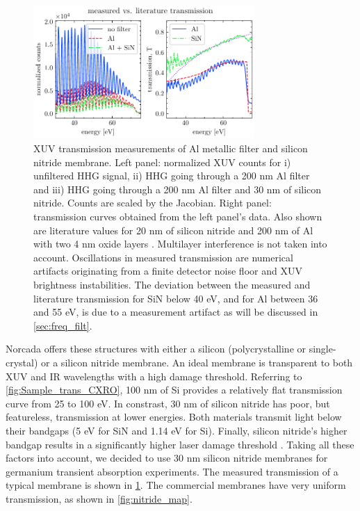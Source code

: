 \begin{figure}
	\centering
	\includegraphics[width=0.75\textwidth]{figures/chap4/SiN_Al_transmission.pdf}
	\caption{XUV transmission measurements of Al metallic filter and silicon nitride membrane. Left panel: normalized XUV counts for i) unfiltered HHG signal, ii) HHG going through a 200 nm Al filter and iii) HHG going through a 200 nm Al filter and 30 nm of silicon nitride. Counts are scaled by the Jacobian. Right panel: transmission curves obtained from the left panel's data. Also shown are literature values for 20 nm of silicon nitride and 200 nm of Al with two 4 nm oxide layers \cite{gulliksonCXROXRayInteractions}. Multilayer interference is not taken into account. Oscillations in measured transmission are numerical artifacts originating from a finite detector noise floor and XUV brightness instabilities. The deviation between the measured and literature transmission for SiN below 40 eV, and for Al between 36 and 55 eV, is due to a measurement artifact as will be discussed in \cref{sec:freq_filt}.}
	\label{fig:SiN_Al_transmission}
\end{figure}

Norcada offers these structures with either a silicon (polycrystalline or single-crystal) or a silicon nitride membrane. An ideal membrane is transparent to both XUV and IR wavelengths with a high damage threshold. Referring to \cref{fig:Sample_trans_CXRO}, 100 nm of Si provides a relatively flat transmission curve from 25 to 100 eV. In constrast, 30 nm of silicon nitride has poor, but featureless, transmission at lower energies. Both materials transmit light below their bandgaps (5 eV for SiN and 1.14 eV for Si). Finally, silicon nitride's higher bandgap results in a significantly higher laser damage threshold \cite{gamalyAblationSolidsFemtosecond2002,austinFemtosecondLaserDamage2018,keldyshIonizationFieldStrong1965}. Taking all these factors into account, we decided to use 30 nm silicon nitride membranes for germanium transient absorption experiments. The measured transmission of a typical membrane is shown in \cref{fig:SiN_Al_transmission}. The commercial membranes have very uniform transmission, as shown in \cref{fig:nitride_map}.

